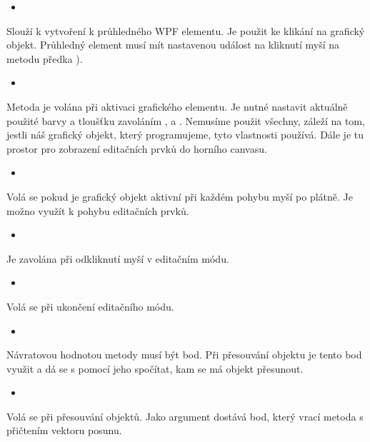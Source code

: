 \documentclass[
  field=inf,
  biblatex,
  glossaries,
  index
]{kidiplom}
\begin{document}
\begin{itemize}
\item {}
\end{itemize}
Slouží k vytvoření k průhledného WPF elementu. Je použit ke klikání na grafický objekt. Průhledný element musí mít nastavenou událost na kliknutí myší na metodu předka ).

\begin{itemize}
\item {}
\end{itemize}
Metoda je volána při aktivaci grafického elementu. Je nutné nastavit aktuálně použité barvy a tloušťku zavoláním ,  a . Nemusíme použit všechny, záleží na tom, jestli náš grafický objekt, který programujeme, tyto vlastnosti používá.
Dále je tu prostor pro zobrazení editačních prvků do horního canvasu.

\begin{itemize}
\item {}
\end{itemize}
Volá se pokud je grafický objekt aktivní při každém pohybu myší po plátně. Je možno využít k pohybu editačních prvků.

\begin{itemize}
\item {}
\end{itemize}
Je zavolána při odkliknutí myší v editačním módu.

\begin{itemize}
\item {}
\end{itemize}
Volá se při ukončení editačního módu.

\begin{itemize}
\item {}
\end{itemize}
Návratovou hodnotou metody musí být bod. Při přesouvání objektu je tento bod využit a dá se s pomocí jeho spočítat, kam se má objekt přesunout.

\begin{itemize}
\item {}
\end{itemize}
Volá se při přesouvání objektů. Jako argument dostává bod, který vrací metoda  s přičtením vektoru posunu.
\end{document}
